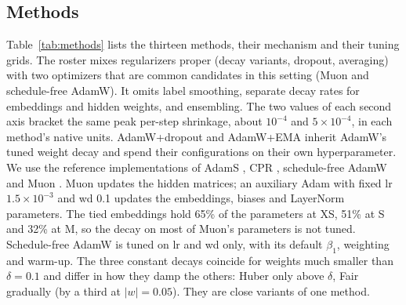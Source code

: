 \documentclass[twoside,11pt]{article}
\begin{document}
\subsection{Methods}

Table~\ref{tab:methods} lists the thirteen methods, their mechanism and their tuning grids. The roster mixes regularizers proper (decay variants, dropout, averaging) with two optimizers that are common candidates in this setting (Muon and schedule-free AdamW). It omits label smoothing, separate decay rates for embeddings and hidden weights, and ensembling. The two values of each second axis bracket the same peak per-step shrinkage, about $10^{-4}$ and $5\times10^{-4}$, in each method's native units. AdamW+dropout and AdamW+EMA inherit AdamW's tuned weight decay and spend their configurations on their own hyperparameter. We use the reference implementations of AdamS \citep{xie2023overlooked}, CPR \citep{franke2024cpr}, schedule-free AdamW \citep{defazio2024road} and Muon \citep{jordan2024muon}. Muon updates the hidden matrices; an auxiliary Adam with fixed lr $1.5\times10^{-3}$ and wd 0.1 updates the embeddings, biases and LayerNorm parameters. The tied embeddings hold 65\% of the parameters at XS, 51\% at S and 32\% at M, so the decay on most of Muon's parameters is not tuned. Schedule-free AdamW is tuned on lr and wd only, with its default $\beta_1$, weighting and warm-up. The three constant decays coincide for weights much smaller than $\delta = 0.1$ and differ in how they damp the others: Huber only above $\delta$, Fair gradually (by a third at $|w| = 0.05$). They are close variants of one method.
\end{document}
